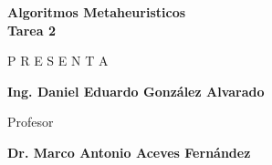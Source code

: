 \begin{titlepage}
    \vspace{1.5cm}
    
        {\Large \bfseries Algoritmos Metaheuristicos \\ Tarea 2\par}
    
    \vfill
    
    {\large P R E S E N T A} \par
    \vspace{0.5cm}
    {\Large \bfseries Ing. Daniel Eduardo González Alvarado\par}
    
    \vspace{2cm}
    
    {\large Profesor}\par
    \vspace{0.5cm}
    {\Large \bfseries Dr. Marco Antonio Aceves Fernández\par}
    
    \vfill
    
    
\end{titlepage}